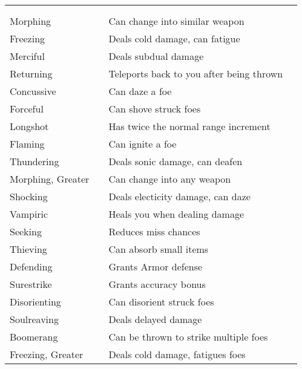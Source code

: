 
\begin{longtabuwrapper}
\begin{longtabu}{l l X l}
 \\
 &  &  &  \\
\bottomrule
Morphing &  & Can change into similar weapon & \pageref{item:Morphing} \\
Freezing &  & Deals cold damage, can fatigue & \pageref{item:Freezing} \\
Merciful &  & Deals subdual damage & \pageref{item:Merciful} \\
Returning &  & Teleports back to you after being thrown & \pageref{item:Returning} \\
Concussive &  & Can daze a foe & \pageref{item:Concussive} \\
Forceful &  & Can shove struck foes & \pageref{item:Forceful} \\
Longshot &  & Has twice the normal range increment & \pageref{item:Longshot} \\
Flaming &  & Can ignite a foe & \pageref{item:Flaming} \\
Thundering &  & Deals sonic damage, can deafen & \pageref{item:Thundering} \\
Morphing, Greater &  & Can change into any weapon & \pageref{item:Morphing, Greater} \\
Shocking &  & Deals electicity damage, can daze & \pageref{item:Shocking} \\
Vampiric &  & Heals you when dealing damage & \pageref{item:Vampiric} \\
Seeking &  & Reduces miss chances & \pageref{item:Seeking} \\
Thieving &  & Can absorb small items & \pageref{item:Thieving} \\
Defending &  & Grants  Armor defense & \pageref{item:Defending} \\
Surestrike &  & Grants  accuracy bonus & \pageref{item:Surestrike} \\
Disorienting &  & Can disorient struck foes & \pageref{item:Disorienting} \\
Soulreaving &  & Deals delayed damage & \pageref{item:Soulreaving} \\
Boomerang &  & Can be thrown to strike multiple foes & \pageref{item:Boomerang} \\
Freezing, Greater &  & Deals cold damage, fatigues foes & \pageref{item:Freezing, Greater} \\

\end{longtabu}
\end{longtabuwrapper}

